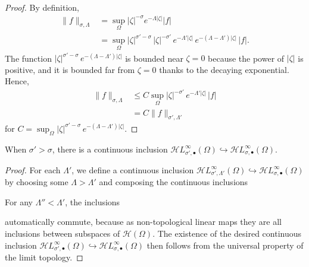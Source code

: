 \documentclass[review]{siamart220329}
\newcommand{\holo}{\mathcal{H}}
\newcommand{\singexp}[2]{\mathcal{H}L^\infty_{#1, #2}}
\newcommand{\singexpalg}[1]{\singexp{#1}{\bullet}}
\newcommand{\domain}{\Omega}
\begin{document}
\begin{proof}
By definition,
\begin{align*}
\|f\|_{\sigma,\Lambda}&=\sup_{\Omega} |\zeta|^{-\sigma}  e^{-\Lambda |\zeta|} |f|\\
&= \sup_{\Omega} |\zeta|^{\sigma'-\sigma}\,|\zeta|^{-\sigma'}\,e^{-\Lambda'|\zeta|}\,  e^{-(\Lambda-\Lambda') |\zeta|} \, |f|.
\end{align*}
The function $|\zeta|^{\sigma'-\sigma}\,  e^{-(\Lambda-\Lambda') |\zeta|}$ is bounded near $\zeta = 0$ because the power of $|\zeta|$ is positive, and it is bounded far from $\zeta = 0$ thanks to the decaying exponential. Hence,
\begin{align*}
\|f\|_{\sigma,\Lambda}&\leq C\sup_\Omega  |\zeta|^{-\sigma'}\, e^{-\Lambda'|\zeta|} \, |f|\\
&=C \|f\|_{\sigma',\Lambda'}
\end{align*}
for $C = \sup_{\Omega}  |\zeta|^{\sigma'-\sigma}\,  e^{-(\Lambda-\Lambda') |\zeta|}$.
\end{proof}
\begin{proposition}\label{prop:inclus-lt-pow-alg}
When $\sigma' > \sigma$, there is a continuous inclusion $\singexpalg{\sigma'}(\domain)\hookrightarrow \singexpalg{\sigma}(\domain)$.
\end{proposition}
\color{blue}\begin{proof}
For each $\Lambda'$, we define a continuous inclusion $\singexp{\sigma'}{\Lambda'}(\domain) \hookrightarrow \singexpalg{\sigma}(\domain)$ by choosing some $\Lambda > \Lambda'$ and composing the continuous inclusions
\begin{center}
\end{center}
For any $\Lambda'' < \Lambda'$, the inclusions
\begin{center}
\end{center}
automatically commute, because as non-topological linear maps they are all inclusions between subspaces of $\holo(\domain)$. The existence of the desired continuous inclusion $\singexpalg{\sigma'}(\Omega)\hookrightarrow \singexpalg{\sigma}(\Omega)$ then follows from the universal property of the limit topology.
\end{proof}\color{black}
\end{document}
